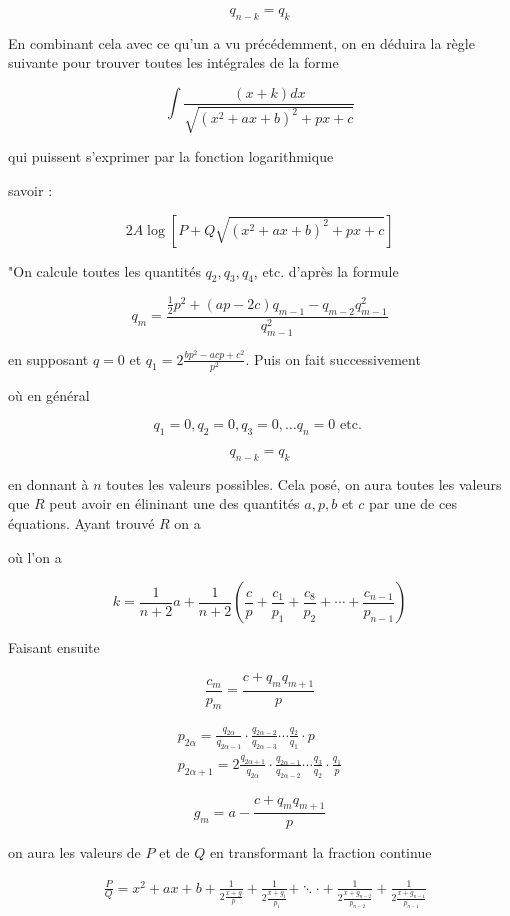 \documentclass{article}
\begin{document}
\[
q_{n-k}=q_{k}
\]

En combinant cela avec ce qu'un a vu précédemment, on en déduira la règle suivante pour trouver toutes les intégrales de la forme

\[
\int \frac{(x+k) d x}{\sqrt{\left(x^{2}+a x+b\right)^{2}+p x+c}}
\]

qui puissent s'exprimer par la fonction logarithmique

savoir :

\[
2 A \log \left[P+Q \sqrt{\left(x^{2}+a x+b\right)^{2}+p x+c}\right]
\]

"On calcule toutes les quantités \(q_{2}, q_{3}, q_{4}\), etc. d'après la formule

\[
q_{m}=\frac{\frac{1}{2} p^{2}+(a p-2 c) q_{m-1}-q_{m-2} q_{m-1}^{2}}{q_{m-1}^{2}}
\]

en supposant \(q=0\) et \(q_{1}=2 \frac{b p^{2}-a c p+c^{2}}{p^{2}}\). Puis on fait successivement

où en général

\[
q_{1}=0, q_{2}=0, q_{3}=0, \ldots q_{n}=0 \text { etc. }
\]

\[
q_{n-k}=q_{k}
\]

en donnant à \(n\) toutes les valeurs possibles. Cela posé, on aura toutes les valeurs que \(R\) peut avoir en élininant une des quantités \(a, p, b\) et \(c\) par une de ces équations. Ayant trouvé \(R\) on a

où l'on a

\[
k=\frac{1}{n+2} a+\frac{1}{n+2}\left(\frac{c}{p}+\frac{c_{1}}{p_{1}}+\frac{c_{8}}{p_{2}}+\cdots+\frac{c_{n-1}}{p_{n-1}}\right)
\]

Faisant ensuite

\[
\frac{c_{m}}{p_{m}}=\frac{c+q_{m} q_{m+1}}{p}
\]

\[
\begin{gathered}
p_{2 \alpha}=\frac{q_{2 \alpha}}{q_{2 \alpha-1}} \cdot \frac{q_{2 \alpha-2}}{q_{2 \alpha-3}} \cdots \frac{q_{2}}{q_{1}} \cdot p \\
p_{2 \alpha+1}=2 \frac{q_{2 \alpha+1}}{q_{2 \alpha}} \cdot \frac{q_{2 \alpha-1}}{q_{2 \alpha-2}} \cdots \frac{q_{3}}{q_{2}} \cdot \frac{q_{1}}{p}
\end{gathered}
\]

\[
g_{m}=a-\frac{c+q_{m} q_{m+1}}{p}
\]

on aura les valeurs de \(P\) et de \(Q\) en transformant la fraction continue

\[
\begin{aligned}
& \frac{P}{Q}=x^{2}+a x+b+\frac{1}{2 \frac{x+g}{p}}+\frac{1}{2 \frac{x+g_{1}}{p_{1}}}+\ddots \cdot+\frac{1}{2 \frac{x+g_{n-2}}{p_{n-2}}}+\frac{1}{2 \frac{x+g_{n-1}}{p_{n-1}}}
\end{aligned}
\]
\end{document}
